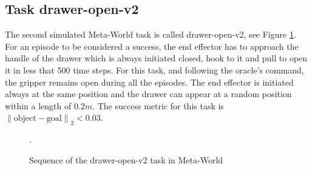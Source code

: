\subsection{Task drawer-open-v2}
\label{subsection:metaworld-open-drawer-task}


The second simulated Meta-World task is called drawer-open-v2, see Figure \ref{fig:sequence-drawer}. For an episode to be considered a success, the end effector has to approach the handle of the drawer which is always initiated closed, hook to it and pull to open it in less that 500 time steps.
For this task, and following the oracle's command, the gripper remains open during all the episodes. The end effector is initiated always at the same position and the drawer can appear at a random position within a length of $0.2m$. The success metric for this task is ${\left\lVert \text{object}-\text{goal} \right\rVert}_2 < 0.03$.
 




 \begin{figure}[H]
  \centering
  \hspace*{\fill}%
   \hfill
   \hfill
  \hspace*{\fill}%
  \caption{Sequence of the drawer-open-v2 task in Meta-World}.
  \label{fig:sequence-drawer}
\end{figure}


